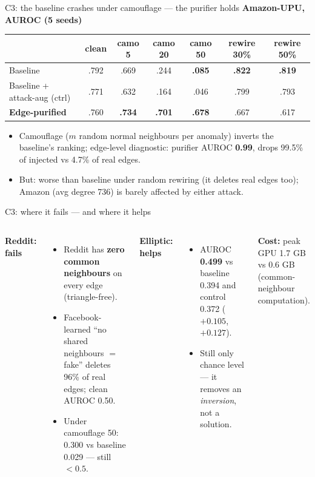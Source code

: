\documentclass[aspectratio=169,11pt]{beamer}
\begin{document}
\begin{frame}{C3: the baseline crashes under camouflage --- the purifier holds}
\centering\small\textbf{Amazon-UPU, AUROC (5 seeds)}\\[3pt]
\footnotesize
\begin{tabular}{lcccccc}
\toprule
 & clean & camo 5 & camo 20 & camo 50 & rewire 30\% & rewire 50\%\\ \midrule
Baseline & .792 & .669 & .244 & \textcolor{bad}{\textbf{.085}} & \textbf{.822} & \textbf{.819}\\
Baseline + attack-aug (ctrl) & .771 & .632 & .164 & .046 & .799 & .793\\
\textbf{Edge-purified} & .760 & \textbf{.734} & \textbf{.701} & \textcolor{good}{\textbf{.678}} & .667 & .617\\ \bottomrule
\end{tabular}
\vspace{5pt}
\begin{itemize}\footnotesize
\item Camouflage ($m$ random normal neighbours per anomaly) \alert{inverts the baseline's ranking}; edge-level diagnostic: purifier AUROC \textbf{0.99}, drops 99.5\% of injected vs 4.7\% of real edges.
\item \textcolor{bad}{But:} worse than baseline under random rewiring (it deletes real edges too); Amazon (avg degree 736) is barely affected by either attack.
\end{itemize}
\end{frame}

\begin{frame}{C3: where it fails --- and where it helps}
\begin{columns}[T]
\textcolor{bad}{\textbf{Reddit: fails}}
\begin{itemize}\footnotesize
\item Reddit has \textbf{zero common neighbours} on every edge (triangle-free).
\item Facebook-learned ``no shared neighbours $=$ fake'' deletes 96\% of real edges; clean AUROC 0.50.
\item Under camouflage 50: 0.300 vs baseline 0.029 --- still $<0.5$.
\end{itemize}
\textcolor{good}{\textbf{Elliptic: helps}}
\begin{itemize}\footnotesize
\item AUROC \textbf{0.499} vs baseline 0.394 and control 0.372 ($+0.105$, $+0.127$).
\item Still only chance level --- it removes an \emph{inversion}, not a solution.
\end{itemize}
\textbf{Cost:} peak GPU 1.7 GB vs 0.6 GB (common-neighbour computation).
\end{columns}
\end{frame}
\end{document}
